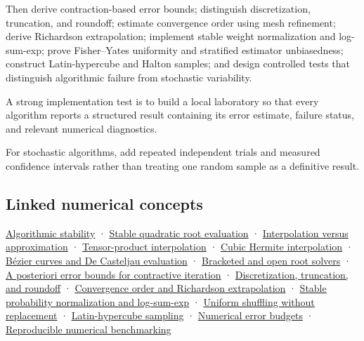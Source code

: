 Then derive contraction-based error bounds; distinguish discretization, truncation, and roundoff; estimate convergence order using mesh refinement; derive Richardson extrapolation; implement stable weight normalization and log-sum-exp; prove Fisher--Yates uniformity and stratified estimator unbiasedness; construct Latin-hypercube and Halton samples; and design controlled tests that distinguish algorithmic failure from stochastic variability.

A strong implementation test is to build a local laboratory so that every algorithm reports a structured result containing its error estimate, failure status, and relevant numerical diagnostics.

For stochastic algorithms, add repeated independent trials and measured confidence intervals rather than treating one random sample as a definitive result.

\subsection{Linked numerical concepts}\label{02-foundations-ii-ch039-linked-numerical-concepts}

\hyperref[02-foundations-ii-ch028-floating-point-answers-error-conditioning-stability-and-stable-arithmetic]{Algorithmic stability} · \hyperref[02-foundations-ii-ch028-floating-point-answers-error-conditioning-stability-and-stable-arithmetic]{Stable quadratic root evaluation} · \hyperref[02-foundations-ii-ch028-reconstructing-values-and-curves-between-samples]{Interpolation versus approximation} · \hyperref[02-foundations-ii-ch028-reconstructing-values-and-curves-between-samples]{Tensor-product interpolation} · \hyperref[02-foundations-ii-ch028-reconstructing-values-and-curves-between-samples]{Cubic Hermite interpolation} · \hyperref[02-foundations-ii-ch028-reconstructing-values-and-curves-between-samples]{Bézier curves and De Casteljau evaluation} · \hyperref[02-foundations-ii-ch028-finding-roots-with-guarantees-and-convergence-checks]{Bracketed and open root solvers} · \hyperref[02-foundations-ii-ch028-finding-roots-with-guarantees-and-convergence-checks]{A posteriori error bounds for contractive iteration} · \hyperref[02-foundations-ii-ch029-separate-discretization-truncation-and-roundoff-measure-convergence]{Discretization, truncation, and roundoff} · \hyperref[02-foundations-ii-ch029-separate-discretization-truncation-and-roundoff-measure-convergence]{Convergence order and Richardson extrapolation} · \hyperref[02-foundations-ii-ch031-keep-probability-weights-stable-before-sampling]{Stable probability normalization and log-sum-exp} · \hyperref[02-foundations-ii-ch031-design-samples-without-replacement-stratified-and-low-discrepancy]{Uniform shuffling without replacement} · \hyperref[02-foundations-ii-ch031-design-samples-without-replacement-stratified-and-low-discrepancy]{Latin-hypercube sampling} · \hyperref[02-foundations-ii-ch029-separate-discretization-truncation-and-roundoff-measure-convergence]{Numerical error budgets} · \hyperref[02-foundations-ii-ch031-test-numerical-methods-and-benchmark-reproducibly]{Reproducible numerical benchmarking}

